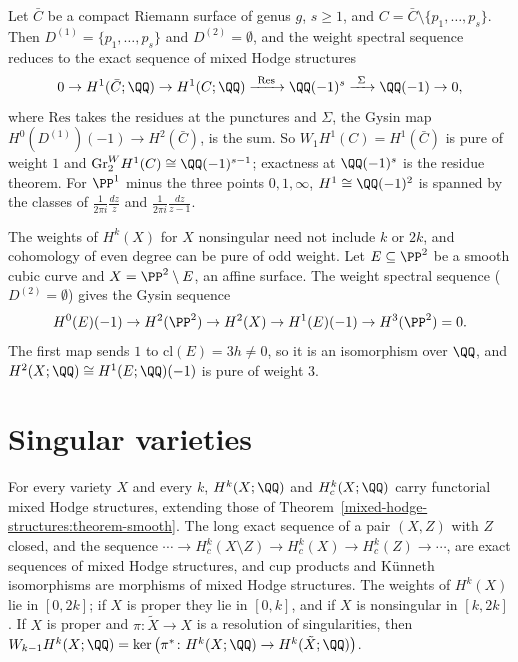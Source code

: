 \begin{example}\label{mixed-hodge-structures:example-punctured-curve}
Let $\bar C$ be a compact Riemann surface of genus $g$, $s \geq 1$, and $C = \bar C \setminus \{p_1, \ldots, p_s\}$. Then $D^{(1)} = \{p_1, \ldots, p_s\}$ and $D^{(2)} = \emptyset$, and the weight spectral
sequence reduces to the exact sequence of mixed Hodge structures
\[
0 \to H^1(\bar C; \QQ) \to H^1(C; \QQ) \xrightarrow{\ \mathrm{Res}\ } \QQ(-1)^{s} \xrightarrow{\ \Sigma\ } \QQ(-1) \to 0,
\]
where $\mathrm{Res}$ takes the residues at the punctures and $\Sigma$, the Gysin map $H^0(D^{(1)})(-1) \to H^2(\bar C)$, is the sum. So $W_1H^1(C) = H^1(\bar C)$ is pure of weight $1$ and
$\mathrm{Gr}^W_2H^1(C) \cong \QQ(-1)^{s-1}$; exactness at $\QQ(-1)^s$ is the residue theorem. For $\PP^1$ minus the three points $0, 1, \infty$, $H^1 \cong \QQ(-1)^2$ is spanned by the classes of
$\frac{1}{2\pi i}\frac{dz}{z}$ and $\frac{1}{2\pi i}\frac{dz}{z - 1}$.
\end{example}

\begin{counterexample}\label{mixed-hodge-structures:counterexample-odd-weight}
The weights of $H^k(X)$ for $X$ nonsingular need not include $k$ or $2k$, and cohomology of even degree can be pure of odd weight. Let $E \subseteq \PP^2$ be a smooth cubic curve and $X = \PP^2 \setminus E$,
an affine surface. The weight spectral sequence ($D^{(2)} = \emptyset$) gives the Gysin sequence
\[
H^0(E)(-1) \to H^2(\PP^2) \to H^2(X) \to H^1(E)(-1) \to H^3(\PP^2) = 0.
\]
The first map sends $1$ to $\mathrm{cl}(E) = 3h \neq 0$, so it is an isomorphism over $\QQ$, and $H^2(X; \QQ) \cong H^1(E; \QQ)(-1)$ is pure of weight $3$.
\end{counterexample}

\section{Singular varieties}\label{mixed-hodge-structures:section-singular}

\begin{theorem}[Deligne]\label{mixed-hodge-structures:theorem-singular}
For every variety $X$ and every $k$, $H^k(X; \QQ)$ and $H^k_c(X; \QQ)$ carry functorial mixed Hodge structures, extending those of Theorem~\ref{mixed-hodge-structures:theorem-smooth}. The long exact
sequence of a pair $(X, Z)$ with $Z$ closed, and the sequence $\cdots \to H^k_c(X \setminus Z) \to H^k_c(X) \to H^k_c(Z) \to \cdots$, are exact sequences of mixed Hodge structures, and cup products and
K\"unneth isomorphisms are morphisms of mixed Hodge structures. The weights of $H^k(X)$ lie in $[0, 2k]$; if $X$ is proper they lie in $[0, k]$, and if $X$ is nonsingular in $[k, 2k]$. If $X$ is proper and
$\pi \colon \tilde X \to X$ is a resolution of singularities, then $W_{k-1}H^k(X; \QQ) = \ker\big(\pi^* \colon H^k(X; \QQ) \to H^k(\tilde X; \QQ)\big)$.
\end{theorem}

